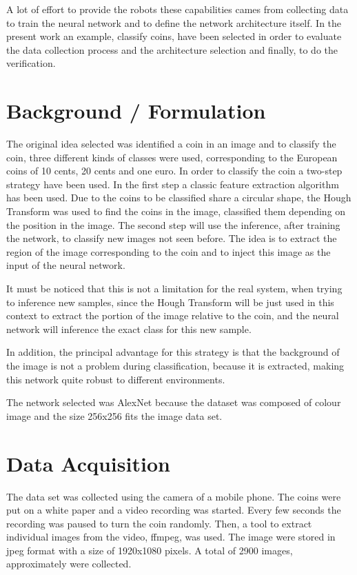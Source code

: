 \documentclass[10pt,journal,compsoc]{IEEEtran}
\begin{document}
A lot of effort to provide the robots these capabilities cames from collecting data to train the neural network and to define the network architecture itself. In the present work an example, classify coins, have been selected in order to evaluate the data collection process and the architecture selection and finally, to do the verification.
	
\section{Background / Formulation}

The original idea selected was identified a coin in an image and to classify the coin, three different kinds of classes were used, corresponding to the European coins of 10 cents, 20 cents and one euro. In order to classify the coin a two-step strategy have been used. In the first step a classic feature extraction algorithm has been used. Due to the coins to be classified share a circular shape, the Hough Transform was used to find the coins in the image, classified them depending on the position in the image. The second step will use the inference, after training the network, to classify new images not seen before. The idea is to extract the region of the image corresponding to the coin and to inject this image as the input of the neural network.

It must be noticed that this is not a limitation for the real system, when trying to inference new samples, since the Hough Transform will be just used in this context to extract the portion of the image relative to the coin, and the neural network will inference the exact class for this new sample. 

In addition, the principal advantage for this strategy is that the background of the image is not a problem during classification, because it is extracted, making this network quite robust to different environments.

The network selected was AlexNet because the dataset was composed of colour image and the size 256x256 fits the image data set.
		
\section{Data Acquisition}

The data set was collected using the camera of a mobile phone. The coins were put on a white paper and a video recording was started. Every few seconds the recording was paused to turn the coin randomly. Then, a tool to extract individual images from the video, ffmpeg, was used. The image were stored in jpeg format with a size of 1920x1080 pixels. A total of 2900 images, approximately were collected.
\end{document}
